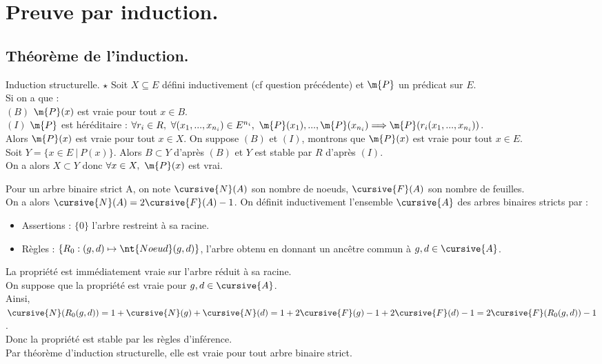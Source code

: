 \documentclass[french, 11pt]{article}
\begin{document}
\section{Preuve par induction.}
\subsection{Théorème de l'induction.}

\begin{thm}{Induction structurelle. $\star$}{}
    Soit $X\subseteq E$ défini inductivement (cf question précédente) et $\m{P}$ un prédicat sur $E$.\\
    Si on a que :\\
    \hspace*{2em}$(B)$ $\m{P}(x)$ est vraie pour tout $x\in B$.\\
    \hspace*{2em}$(I)$ $\m{P}$ est héréditaire : $\forall r_i\in R, ~ \forall (x_1,...,x_{n_i})\in E^{n_i}, ~ \m{P}(x_1),...,\m{P}(x_{n_i})\Longrightarrow \m{P}(r_i(x_1, ..., x_{n_i}))$.\\
    Alors $\m{P}(x)$ est vraie pour tout $x\in X$.
    \tcblower
    On suppose $(B)$ et $(I)$, montrons que $\m{P}(x)$ est vraie pour tout $x\in E$.\\
    Soit $Y = \{x\in E ~ | ~ P(x)\}$. Alors $B \subset Y$ d'après $(B)$ et $Y$ est stable par $R$ d'après $(I)$.\\
    On a alors $X \subset Y$ donc $\forall x \in X, ~ \m{P}(x)$ est vrai.
\end{thm}

\pagebreak

\begin{ex}{}{}
    Pour un arbre binaire strict A, on note $\cursive{N}(A)$ son nombre de noeuds, $\cursive{F}(A)$ son nombre de feuilles.\\
    On a alors $\cursive{N}(A)=2\cursive{F}(A)-1$.
    \tcblower
    On définit inductivement l'ensemble $\cursive{A}$ des arbres binaires stricts par :
    \begin{itemize}[topsep=0pt,itemsep=-0.9 ex]
        \item Assertions : $\{0\}$ l'arbre restreint à sa racine.
        \item Règles : $\{R_0:(g,d) \mapsto \nt{Noeud}(g,d)\}$, l'arbre obtenu en donnant un ancêtre commun à $g,d\in\cursive{A}$.
    \end{itemize}
    La propriété est immédiatement vraie sur l'arbre réduit à sa racine.\\
    On suppose que la propriété est vraie pour $g,d\in\cursive{A}$.\\
    Ainsi, $\cursive{N}(R_0(g,d))=1+\cursive{N}(g)+\cursive{N}(d)=1+2\cursive{F}(g)-1+2\cursive{F}(d)-1=2\cursive{F}(R_0(g,d))-1$.\\
    Donc la propriété est stable par les règles d'inférence.\\
    Par théorème d'induction structurelle, elle est vraie pour tout arbre binaire strict.
\end{ex}
\end{document}
